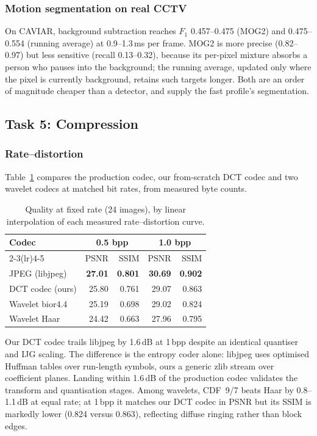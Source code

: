 \documentclass[conference,10pt]{IEEEtran}
\newcommand{\hdr}[1]{\textbf{#1}}
\begin{document}
\subsubsection{Motion segmentation on real CCTV}
On CAVIAR, background subtraction reaches $F_1$ 0.457--0.475 (MOG2) and
0.475--0.554 (running average) at 0.9--1.3\,ms per frame. MOG2 is more precise
(0.82--0.97) but less sensitive (recall 0.13--0.32), because its per-pixel
mixture absorbs a person who pauses into the background; the running average,
updated only where the pixel is currently background, retains such targets
longer. Both are an order of magnitude cheaper than a detector, and supply the
\textsf{fast} profile's segmentation.

\subsection{Task 5: Compression}\label{sec:res-comp}
\subsubsection{Rate--distortion}
Table~\ref{tab:rd} compares the production codec, our from-scratch DCT codec
and two wavelet codecs at matched bit rates, from measured byte counts.

\begin{table}[!t]
\caption{Quality at fixed rate (24 images), by linear interpolation of each
measured rate--distortion curve.}
\label{tab:rd}
\centering
\scriptsize
\begin{tabular}{@{}lrrrr@{}}
\toprule
\multirow{2}{*}{\hdr{Codec}} & \multicolumn{2}{c}{\hdr{0.5 bpp}} & \multicolumn{2}{c}{\hdr{1.0 bpp}} \\
\cmidrule(lr){2-3}\cmidrule(lr){4-5}
 & PSNR & SSIM & PSNR & SSIM \\
\midrule
JPEG (libjpeg)   & \textbf{27.01} & \textbf{0.801} & \textbf{30.69} & \textbf{0.902} \\
DCT codec (ours) & 25.80 & 0.761 & 29.07 & 0.863 \\
Wavelet bior4.4  & 25.19 & 0.698 & 29.02 & 0.824 \\
Wavelet Haar     & 24.42 & 0.663 & 27.96 & 0.795 \\
\bottomrule
\end{tabular}
\end{table}


Our DCT codec trails libjpeg by 1.6\,dB at 1\,bpp despite an identical
quantiser and IJG scaling. The difference is the entropy coder alone: libjpeg
uses optimised Huffman tables over run-length symbols, ours a generic zlib
stream over coefficient planes. Landing within 1.6\,dB of the production codec
validates the transform and quantisation stages. Among wavelets, CDF~9/7 beats
Haar by 0.8--1.1\,dB at equal rate; at 1\,bpp it matches our DCT codec in PSNR
but its SSIM is markedly lower (0.824 versus 0.863), reflecting diffuse ringing
rather than block edges.
\end{document}
